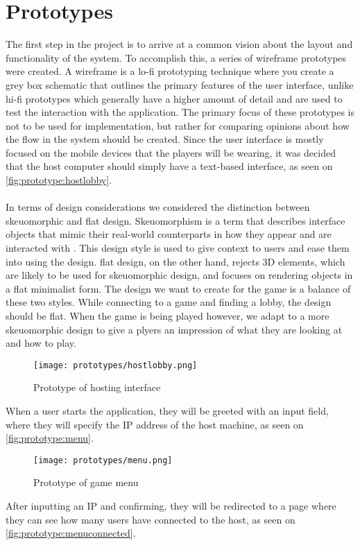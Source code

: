 \section{Prototypes}\label{sec:sprint1-prototypes}
The first step in the project is to arrive at a common vision about the layout and functionality of the system.
To accomplish this, a series of wireframe prototypes were created.
A wireframe is a lo-fi prototyping technique where you create a grey box schematic that outlines the primary features of the user interface, unlike hi-fi prototypes which generally have a higher amount of detail and are used to test the interaction with the application.
The primary focus of these prototypes is not to be used for implementation, but rather for comparing opinions about how the flow in the system should be created.
Since the user interface is mostly focused on the mobile devices that the players will be wearing, it was decided that the host computer should simply have a text-based interface, as seen on \autoref{fig:prototype:hostlobby}.
\\\\
In terms of design considerations we considered the distinction between skeuomorphic and flat design.
Skeuomorphism is a term that describes interface objects that mimic their real-world counterparts in how they appear and are interacted with \cite{skeuomorphism}.
This design style is used to give context to users and ease them into using the design.
flat design, on the other hand, rejects 3D elements, which are likely to be used for skeuomorphic design, and focuses on rendering objects in a flat minimalist form.
The design we want to create for the game is a balance of these two styles.
While connecting to a game and finding a lobby, the design should be flat.
When the game is being played however, we adapt to a more skeuomorphic design to give a plyers an impression of what they are looking at and how to play.


\begin{figure}[H]
    \centering
    \texttt{[image: prototypes/hostlobby.png]}
    \caption{Prototype of hosting interface}
    \label{fig:prototype:hostlobby}
\end{figure}
\noindent
When a user starts the application, they will be greeted with an input field, where they will specify the IP address of the host machine, as seen on \autoref{fig:prototype:menu}. 

\begin{figure}[H]
    \centering
    \texttt{[image: prototypes/menu.png]}
    \caption{Prototype of game menu}
    \label{fig:prototype:menu}
\end{figure}
\noindent
After inputting an IP and confirming, they will be redirected to a page where they can see how many users have connected to the host, as seen on \autoref{fig:prototype:menuconnected}. 

